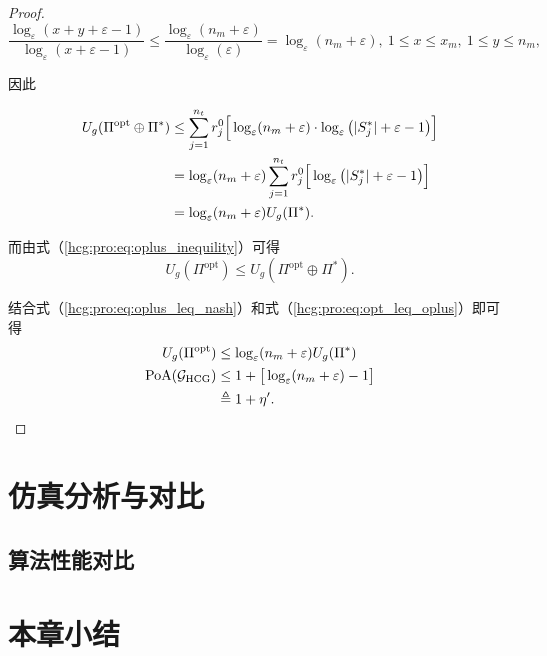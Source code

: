 \begin{proposition}
\begin{proof}
		\begin{equation}
			\frac{\log_{\varepsilon}(x+y+\varepsilon-1)}{\log_{\varepsilon}(x+\varepsilon-1)} \leq \frac{\log_{\varepsilon}(n_m+\varepsilon)}{\log_{\varepsilon}(\varepsilon)} = \log_{\varepsilon}(n_m+\varepsilon),\ 1\leq x \leq x_m,\ 1 \leq y \leq n_m,
		\end{equation}
		
		因此
		
		\begin{align}
			\label{hcg:pro:eq:oplus_leq_nash}
			U_g(\Pi^{\text{opt}} \oplus \Pi^*) &\leq \sum_{j=1}^{n_t} r_j^0 \Big[\log_{\varepsilon}(n_m+\varepsilon) \cdot \log_{\varepsilon}\big(|S_j^*|+ \varepsilon - 1\big) \Big]\notag\\
			&= \log_{\varepsilon}(n_m+\varepsilon) \sum_{j=1}^{n_t} r_j^0 \Big[\log_{\varepsilon}\big(|S_j^*|+ \varepsilon - 1\big) \Big]\notag\\
			&= \log_{\varepsilon}(n_m+\varepsilon) U_g(\Pi^*).
		\end{align}
		
		而由式（\ref{hcg:pro:eq:oplus_inequility}）可得
		\begin{equation}
		\label{hcg:pro:eq:opt_leq_oplus}
			U_g(\Pi^{\text{opt}}) \leq U_g(\Pi^{\text{opt}} \oplus \Pi^*).
		\end{equation}
		
		结合式（\ref{hcg:pro:eq:oplus_leq_nash}）和式（\ref{hcg:pro:eq:opt_leq_oplus}）即可得
		\begin{align}
		\label{hcg:pro:eq:PoA_max}
			U_g(\Pi^{\text{opt}}) &\leq \log_{\varepsilon}(n_m+\varepsilon) U_g(\Pi^*)\\
			\mathrm{PoA}(\mathcal{G}_{\text{HCG}}) &\leq 1+ \big[\log_{\varepsilon}(n_m+\varepsilon) -1\big]\notag\\
			&\triangleq 1+\eta'.
		\end{align}
		
				
		\end{proof}
\end{proposition}


\section{仿真分析与对比}
\label{hg:sec:simulation}

\subsection{算法性能对比}
\label{simu:sub:conpare}

\section{本章小结}
\label{hg:sec:conclusion}




